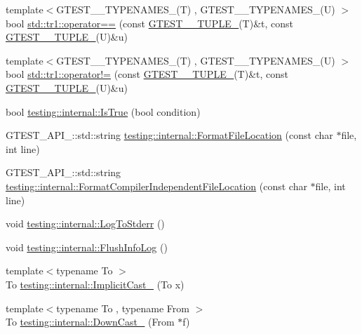 \begin{DoxyCompactItemize}
\item 
{\footnotesize template$<$G\-T\-E\-S\-T\-\_\-\_\-\-T\-Y\-P\-E\-N\-A\-M\-E\-S\-\_\-(\-T) , G\-T\-E\-S\-T\-\_\-\_\-\-T\-Y\-P\-E\-N\-A\-M\-E\-S\-\_\-(\-U) $>$ }\\bool \hyperlink{namespacestd_1_1tr1_af4516de784404381f9b14797694b6311}{std\-::tr1\-::operator==} (const \hyperlink{gtest-tuple_8h_a275e7bcd84299cc44b9c1dba971951c4}{G\-T\-E\-S\-T\-\_\-\_\-\-T\-U\-P\-L\-E\-\_\-}(T)\&t, const \hyperlink{gtest-tuple_8h_a275e7bcd84299cc44b9c1dba971951c4}{G\-T\-E\-S\-T\-\_\-\_\-\-T\-U\-P\-L\-E\-\_\-}(U)\&u)
\item 
{\footnotesize template$<$G\-T\-E\-S\-T\-\_\-\_\-\-T\-Y\-P\-E\-N\-A\-M\-E\-S\-\_\-(\-T) , G\-T\-E\-S\-T\-\_\-\_\-\-T\-Y\-P\-E\-N\-A\-M\-E\-S\-\_\-(\-U) $>$ }\\bool \hyperlink{namespacestd_1_1tr1_a058882c51de469b5e78d29076f864940}{std\-::tr1\-::operator!=} (const \hyperlink{gtest-tuple_8h_a275e7bcd84299cc44b9c1dba971951c4}{G\-T\-E\-S\-T\-\_\-\_\-\-T\-U\-P\-L\-E\-\_\-}(T)\&t, const \hyperlink{gtest-tuple_8h_a275e7bcd84299cc44b9c1dba971951c4}{G\-T\-E\-S\-T\-\_\-\_\-\-T\-U\-P\-L\-E\-\_\-}(U)\&u)
\item 
bool \hyperlink{namespacetesting_1_1internal_a527b9bcc13669b9a16400c8514266254}{testing\-::internal\-::\-Is\-True} (bool condition)
\item 
G\-T\-E\-S\-T\-\_\-\-A\-P\-I\-\_\-\-::std\-::string \hyperlink{namespacetesting_1_1internal_a31b7c3abed4a7c395f42c61e993989f4}{testing\-::internal\-::\-Format\-File\-Location} (const char $\ast$file, int line)
\item 
G\-T\-E\-S\-T\-\_\-\-A\-P\-I\-\_\-\-::std\-::string \hyperlink{namespacetesting_1_1internal_a1ee4cde97868c53e442d3182496a9f3c}{testing\-::internal\-::\-Format\-Compiler\-Independent\-File\-Location} (const char $\ast$file, int line)
\item 
void \hyperlink{namespacetesting_1_1internal_a06b1b20029fbd1dbeb59752f914fab84}{testing\-::internal\-::\-Log\-To\-Stderr} ()
\item 
void \hyperlink{namespacetesting_1_1internal_a2135f223bf6b527729aeaa651115183b}{testing\-::internal\-::\-Flush\-Info\-Log} ()
\item 
{\footnotesize template$<$typename To $>$ }\\To \hyperlink{namespacetesting_1_1internal_a982df3f369643b175f79cda4048bc3b9}{testing\-::internal\-::\-Implicit\-Cast\-\_\-} (To x)
\item 
{\footnotesize template$<$typename To , typename From $>$ }\\To \hyperlink{namespacetesting_1_1internal_a1a1a1aed3fe00908b8a45d5ab4a33665}{testing\-::internal\-::\-Down\-Cast\-\_\-} (From $\ast$f)

\end{DoxyCompactItemize}
